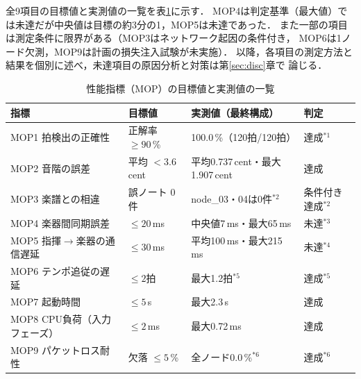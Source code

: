\documentclass[uplatex,dvipdfmx]{jlreq}
\begin{document}
全9項目の目標値と実測値の一覧を表\ref{tab:mop}に示す．
MOP4は判定基準（最大値）では未達だが中央値は目標の約3分の1，MOP5は未達であった．
また一部の項目は測定条件に限界がある（MOP3はネットワーク起因の条件付き，
MOP6は1ノード欠測，MOP9は計画の損失注入試験が未実施）．
以降，各項目の測定方法と結果を個別に述べ，未達項目の原因分析と対策は第\ref{sec:disc}章で
論じる．

\begin{table}[tbp]
  \centering
  \caption{性能指標（MOP）の目標値と実測値の一覧}\label{tab:mop}
  \small
  \setlength{\tabcolsep}{4pt}
  \begin{tabular}{llll}
    \hline
    指標 & 目標値 & 実測値（最終構成） & 判定 \\
    \hline
    MOP1 拍検出の正確性 & 正解率 $\ge 90$\,\% & 100.0\,\%（120拍/120拍） & 達成${}^{*1}$ \\
    MOP2 音階の誤差 & 平均 $< 3.6$\,cent & 平均0.737\,cent・最大1.907\,cent & 達成 \\
    MOP3 楽譜との相違 & 誤ノート 0件 & node\_03・04は0件${}^{*2}$ & 条件付き達成${}^{*2}$ \\
    MOP4 楽器間同期誤差 & $\le 20$\,ms & 中央値7\,ms・最大65\,ms & 未達${}^{*3}$ \\
    MOP5 指揮$\to$楽器の通信遅延 & $\le 30$\,ms & 平均100\,ms・最大215\,ms & 未達${}^{*4}$ \\
    MOP6 テンポ追従の遅延 & $\le 2$拍 & 最大1.2拍${}^{*5}$ & 達成${}^{*5}$ \\
    MOP7 起動時間 & $\le 5$\,s & 最大2.3\,s & 達成 \\
    MOP8 CPU負荷（入力フェーズ） & $\le 2$\,ms & 最大0.72\,ms & 達成 \\
    MOP9 パケットロス耐性 & 欠落 $\le 5$\,\% & 全ノード0.0\,\%${}^{*6}$ & 達成${}^{*6}$ \\
    \hline
  \end{tabular}

\end{table}
\end{document}
